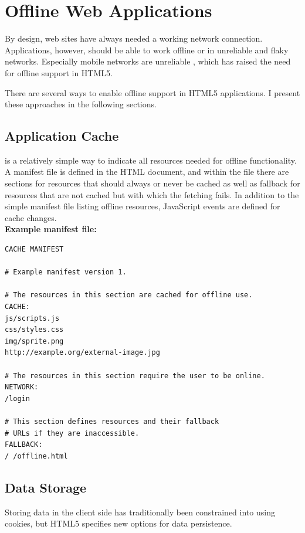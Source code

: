 \section{Offline Web Applications}

By design, web sites have always needed a working network
connection. Applications, however, should be able to work offline or
in unreliable and flaky networks. Especially mobile networks are
unreliable \cite{zandy2002reliable}, which has raised the need for
offline support in HTML5.

There are several ways to enable offline support in HTML5
applications. I present these approaches in the following sections.

\subsection{Application Cache}
\label{section:appcache}

 is a relatively simple way to indicate all resources
needed for offline functionality. A manifest file is defined in the
HTML document, and within the file there are sections for resources
that should always or never be cached as well as fallback 
for resources that are not cached but with which the fetching
fails. In addition to the simple manifest file listing offline
resources, JavaScript events are defined for cache
changes. \cite{HTML5draft} \\

\noindent \textbf{Example manifest file:}
\begin{verbatim}
CACHE MANIFEST

# Example manifest version 1.

# The resources in this section are cached for offline use.
CACHE:
js/scripts.js
css/styles.css
img/sprite.png
http://example.org/external-image.jpg

# The resources in this section require the user to be online.
NETWORK:
/login

# This section defines resources and their fallback
# URLs if they are inaccessible.
FALLBACK:
/ /offline.html
\end{verbatim}

\subsection{Data Storage}
\label{section:datastorage}

Storing data in the client side has traditionally been constrained
into using cookies, but HTML5 specifies new options for data
persistence.

